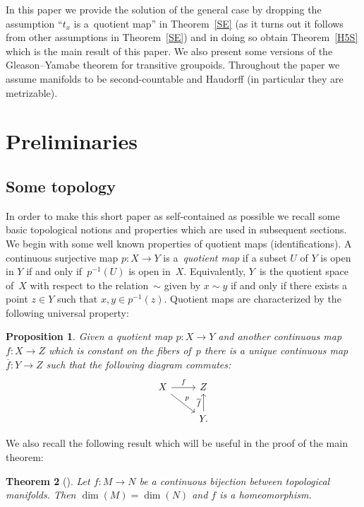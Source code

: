 \documentclass[11pt]{article}
\newtheorem{tw}{Theorem}[section]
\newtheorem{prop}[tw]{Proposition}
\begin{document}
In this paper we provide the solution of the general case by dropping the assumption ``$t_x$ is a~quotient map'' in Theorem~\ref{SE} (as it turns out it follows from other assumptions in Theorem~\ref{SE}) and in doing so obtain Theorem~\ref{H5S} which is the main result of this paper. We also present some versions of the Gleason--Yamabe theorem for transitive groupoids. Throughout the paper we assume manifolds to be second-countable and Haudorff (in particular they are metrizable).

\section{Preliminaries}
\subsection{Some topology}
In order to make this short paper as self-contained as possible we recall some basic topological notions and properties which are used in subsequent sections. We begin with some well known properties of quotient maps (identifications). A continuous surjective map $p\colon X\rightarrow Y$ is a~\emph{quotient map} if a subset $U$ of $Y$ is open in $Y$ if and only if~$p^{-1}(U)$ is open in~$X$. Equivalently, $Y$~is the quotient space of~$X$ with respect to the relation~$\sim$ given by $x\sim y$ if and only if there exists a point $z\in Y$ such that $x,y\in p^{-1}(z)$. Quotient maps are characterized by the following universal property:
\begin{prop}\label{PtQ} Given a quotient map $p\colon X\rightarrow Y$ and another continuous map $f\colon X\rightarrow Z$ which is constant on the fibers of~$p$ there is a unique continuous map $\overline{f}\colon Y\rightarrow Z$ such that the following diagram commutes:
\begin{equation*}
\begin{tikzcd}
X \arrow[rd, "p"] \arrow[r, "f"] & Z \\
& Y.\arrow[u, "\overline{f}"]
\end{tikzcd}
\end{equation*}
\end{prop}
We also recall the following result which will be useful in the proof of the main theorem:
\begin{tw}[{\cite[Corollary~5]{PPS}}]\label{MH} Let $f\colon M\rightarrow N$ be a continuous bijection between topological manifolds. Then $\dim(M)=\dim(N)$ and $f$ is a homeomorphism.
\end{tw}
\end{document}
